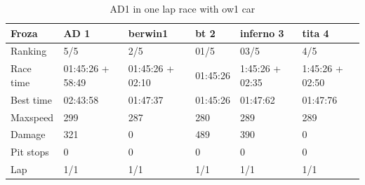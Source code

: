 \documentclass{llncs}
\begin{document}
\begin{table}[h!]
	\caption{AD1 in one lap race with ow1  car}
	\label{resultat33}
	\begin{tabular}{ |p{3cm}|p{2cm}|p{2cm}|p{2 cm}|p{2 cm}|p{2 cm}|}
		\hline
		{ \color{blue}\textbf{Froza} }&
		{ \color{red} \textbf{ AD 1} } &
		{ \color{red}\textbf{ berwin1 }}&  
		{ \color{red} \textbf{bt 2 } } &
		
		{ \color{red} \textbf{inferno 3} }
		&{ \color{red} \textbf{tita 4} }
		\\
		\hline
		Ranking  & 5/5  & 2/5 & 01/5 & 03/5& 4/5
		\\
		\hline
		Race time & 01:45:26 + 58:49 & 01:45:26 + 02:10 & 01:45:26  & 1:45:26 + 02:35 &  1:45:26 + 02:50 
		\\
		\hline
		Best time & 02:43:58 & 01:47:37 & 01:45:26 & 01:47:62& 01:47:76
		\\
		\hline 
		Maxspeed & 299  & 287 & 280 & 289 & 289
		\\
		\hline
		
		Damage & 321 & 0 & 489 & 390 & 0
		\\
		\hline 
		
		
		Pit stops & 0 & 0 & 0 & 0 & 0
		\\
		\hline 
		Lap & 1/1 & 1/1  & 1/1 & 1/1& 1/1 
		\\
		\hline	
	\end{tabular} 
	
	
	
\end{table}
\end{document}
